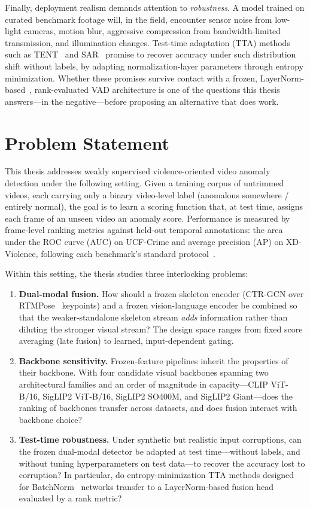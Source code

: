 Finally, deployment realism demands attention to \emph{robustness}. A model trained on curated
benchmark footage will, in the field, encounter sensor noise from low-light cameras, motion blur,
aggressive compression from bandwidth-limited transmission, and illumination changes. Test-time
adaptation (TTA) methods such as TENT~\cite{wang2021tent} and SAR~\cite{niu2023sar} promise to
recover accuracy under such distribution shift without labels, by adapting normalization-layer
parameters through entropy minimization. Whether these promises survive contact with a frozen,
LayerNorm-based~\cite{ba2016layernorm}, rank-evaluated VAD architecture is one of the questions this
thesis answers---in the negative---before proposing an alternative that does work.

\section{Problem Statement}
\label{sec:intro-problem}

This thesis addresses weakly supervised violence-oriented video anomaly detection under the
following setting. Given a training corpus of untrimmed videos, each carrying only a binary
video-level label (anomalous somewhere / entirely normal), the goal is to learn a scoring function
that, at test time, assigns each frame of an unseen video an anomaly score. Performance is measured
by frame-level ranking metrics against held-out temporal annotations: the area under the ROC curve
(AUC) on UCF-Crime and average precision (AP) on XD-Violence, following each benchmark's standard
protocol~\cite{sultani2018ucfcrime,wu2020xdviolence}.

Within this setting, the thesis studies three interlocking problems:

\begin{enumerate}
    \item \textbf{Dual-modal fusion.} How should a frozen skeleton encoder (CTR-GCN over
RTMPose~\cite{jiang2023rtmpose} keypoints) and a frozen vision-language encoder be combined so that
the weaker-standalone skeleton stream \emph{adds} information rather than diluting the stronger
visual stream? The design space ranges from fixed score averaging (late fusion) to learned,
input-dependent gating.
    \item \textbf{Backbone sensitivity.} Frozen-feature pipelines inherit the properties of their
backbone. With four candidate visual backbones spanning two architectural families and an order of
magnitude in capacity---CLIP ViT-B/16, SigLIP2 ViT-B/16, SigLIP2 SO400M, and SigLIP2 Giant---does
the ranking of backbones transfer across datasets, and does fusion interact with backbone choice?
    \item \textbf{Test-time robustness.} Under synthetic but realistic input corruptions, can the
frozen dual-modal detector be adapted at test time---without labels, and without tuning
hyperparameters on test data---to recover the accuracy lost to corruption? In particular, do
entropy-minimization TTA methods designed for BatchNorm~\cite{ioffe2015batchnorm} networks transfer
to a LayerNorm-based fusion head evaluated by a rank metric?
\end{enumerate}

